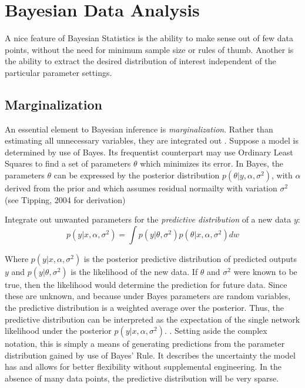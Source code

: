 \section{Bayesian Data Analysis} %


A nice feature of Bayesian Statistics is the ability to make sense out of few data points, without the need for minimum sample size or rules of thumb.  Another is the ability to extract the desired distribution of interest independent of the particular parameter settings. \cite{bishop2006pattern}

\subsection{Marginalization}

An essential element to Bayesian inference is \textit{marginalization}.  Rather than estimating all unnecessary variables, they are integrated out
\cite{tipping2004bayesian}.  Suppose a model is determined by use of Bayes.  Its frequentist counterpart may use Ordinary Least Squares to find a set of parameters $\theta$ which minimizes its error. In Bayes, the parameters $\theta$ can be expressed by the posterior distribution $p(\theta|y,\alpha,\sigma^2)$, with $\alpha$ derived from the prior and which assumes residual normailty with variation $\sigma^2$ (see Tipping, 2004 \cite{tipping2004bayesian} for derivation)

Integrate out unwanted parameters for the \textit{predictive distribution} of a new data $y$:
$$
p(y|x,\alpha,\sigma^2) = \int p(y|\theta,\sigma^2) p(\theta|x,\alpha,\sigma^2) dw
$$

Where  $p(y|x,\alpha,\sigma^2)$ is the posterior predictive distribution of predicted outputs $y$ and $p(y|\theta,\sigma^2)$ is the likelihood of the new data.  If $\theta$ and $\sigma^2$ were known to be true, then the likelihood would determine the prediction for future data.  Since these are unknown, and because under Bayes parameters are random variables, the predictive distribution is a weighted average over the posterior.  Thus, the  predictive distribution can be interpreted as the expectation of the single network likelihood under the posterior $p(y|x,\alpha,\sigma^2)$. \cite{salad} \cite{Jospin}.  
Setting aside the complex notation, this is simply a means of generating predictions from the parameter distribution gained by use of Bayes' Rule.  It describes the uncertainty the model has and allows for better flexibility without supplemental engineering.
In the absence of many data points, the predictive distribution will be very sparse. \cite{tipping2004bayesian}

